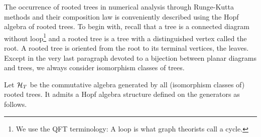 \documentclass[10pt,here,feynmf]{article}
\begin{document}
The occurrence of rooted trees in numerical analysis through Runge-Kutta methods and their composition law is conveniently described using the Hopf algebra of rooted trees. To begin with, recall that a tree is a connected diagram without loop\footnote{We use the QFT terminology: A loop is what graph theorists call a cycle.}  and a rooted tree is a tree with a distinguished vertex called the root. A rooted tree is oriented from the root to its terminal vertices, the leaves. Except in the very last paragraph devoted to a bijection between planar diagrams and trees, we always consider isomorphism classes of trees. 
 


Let ${\cal H}_{T}$ be the commutative algebra generated by all (isomorphism classes of) rooted trees. It admits a Hopf algebra structure defined on the generators as follows.
\end{document}
